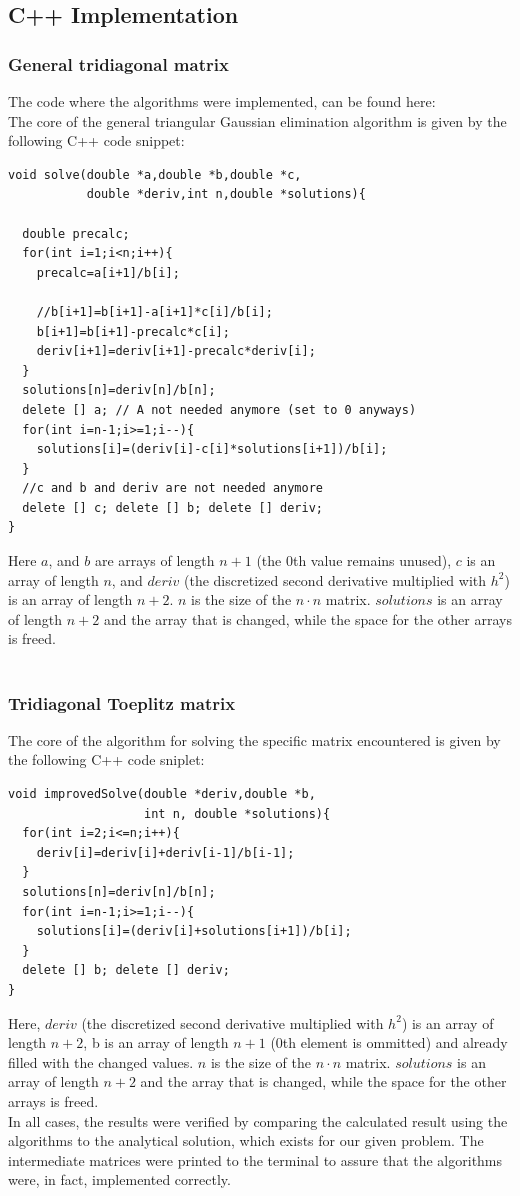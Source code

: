 \documentclass[10pt,a4paper]{article}
\begin{document}
\subsection{C++ Implementation}
\subsubsection{General tridiagonal matrix}
The code where the algorithms were implemented, can be found here: \\
The core of the general triangular Gaussian elimination algorithm is given by the following C++ code snippet:
\begin{lstlisting}[caption=Code for solving the general triangular matrix]
void solve(double *a,double *b,double *c,
		   double *deriv,int n,double *solutions){
  
  double precalc;
  for(int i=1;i<n;i++){
    precalc=a[i+1]/b[i];
    
    //b[i+1]=b[i+1]-a[i+1]*c[i]/b[i];
    b[i+1]=b[i+1]-precalc*c[i]; 
    deriv[i+1]=deriv[i+1]-precalc*deriv[i];
  }
  solutions[n]=deriv[n]/b[n];
  delete [] a; // A not needed anymore (set to 0 anyways)
  for(int i=n-1;i>=1;i--){
    solutions[i]=(deriv[i]-c[i]*solutions[i+1])/b[i];
  }
  //c and b and deriv are not needed anymore
  delete [] c; delete [] b; delete [] deriv; 
}
\end{lstlisting}
Here $a$, and $b$ are arrays of length $n+1$ (the 0th value remains unused), $c$ is an array of length $n$, and $deriv$ (the discretized second derivative multiplied with $h^2$) is an array of length $n+2$. $n$ is the size of the $ n\cdot n$ matrix. $solutions$ is an array of length $n+2$ and the array that is changed, while the space for the other arrays is freed.\\\\
\subsubsection{Tridiagonal Toeplitz matrix}
The core of the algorithm for solving the specific matrix encountered is given by the following C++ code sniplet:
\begin{lstlisting}[caption=Code for solving the specific triangular matrix]
void improvedSolve(double *deriv,double *b,
				   int n, double *solutions){
  for(int i=2;i<=n;i++){
    deriv[i]=deriv[i]+deriv[i-1]/b[i-1];
  }
  solutions[n]=deriv[n]/b[n];
  for(int i=n-1;i>=1;i--){
    solutions[i]=(deriv[i]+solutions[i+1])/b[i];
  }
  delete [] b; delete [] deriv;
}
\end{lstlisting}
Here, $deriv$ (the discretized second derivative multiplied with $h^2$) is an array of length $n+2$, b is an array of length $n+1$ (0th element is ommitted) and already filled with the changed values.  $n$ is the size of the $n\cdot n$ matrix. $solutions$ is an array of length $n+2$ and the array that is changed, while the space for the other arrays is freed.\\
In all cases, the results were verified by comparing the calculated result using the algorithms to the analytical solution, which exists for our given problem. The intermediate matrices were printed to the terminal to assure that the algorithms were, in fact, implemented correctly. 
\end{document}
